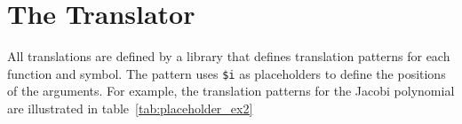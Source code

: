 \section{The Translator}
 

All translations are defined by a library that defines translation patterns for each function and symbol. The pattern uses \verb|$i| as placeholders to define the positions of the arguments. For example, the translation patterns for the Jacobi polynomial are illustrated in table~\ref{tab:placeholder_ex2}

